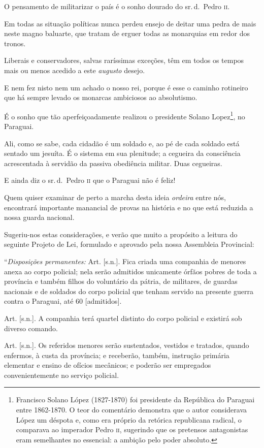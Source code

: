 O pensamento de militarizar o país é o sonho dourado do sr.\,d.~Pedro \textsc{ii}.

Em todas as situação políticas nunca perdeu ensejo de deitar uma pedra
de mais neste magno baluarte, que tratam de erguer todas as monarquias
em redor dos tronos.

Liberais e conservadores, salvas raríssimas exceções, têm em todos os
tempos mais ou menos acedido a este \emph{augusto} desejo.

E nem fez nisto nem um achado o nosso rei, porque é esse o caminho
rotineiro que há sempre levado os monarcas ambiciosos ao absolutismo.

É o sonho que tão aperfeiçoadamente realizou o presidente Solano
Lopez\footnote{Francisco Solano López (1827-1870) foi presidente da
  República do Paraguai entre 1862-1870. O teor do comentário demonstra
  que o autor considerava López um déspota e, como era próprio da
  retórica republicana radical, o comparava ao imperador Pedro \textsc{ii},
  sugerindo que os pretensos antagonistas eram semelhantes no essencial:
  a ambição pelo poder absoluto.}, no Paraguai.

Ali, como se sabe, cada cidadão é um soldado e, ao pé de cada soldado
está sentado um jesuíta. É o sistema em sua plenitude; a cegueira da
consciência acrescentada à servidão da passiva obediência militar. Duas
cegueiras.

E ainda diz o sr.\,d.~Pedro \textsc{ii} que o Paraguai não é feliz!

Quem quiser examinar de perto a marcha desta ideia \emph{ordeira} entre
nós, encontrará importante manancial de provas na história e no que está
reduzida a nossa guarda nacional.

Sugeriu-nos estas considerações, e verão que muito a propósito a leitura
do seguinte Projeto de Lei, formulado e aprovado pela nossa Assembleia
Provincial:

``\emph{Disposições permanentes:} Art. {[}s.n.{]}. Fica criada uma
companhia de menores anexa ao corpo policial; nela serão admitidos
unicamente órfãos pobres de toda a província e também filhos do
voluntário da pátria, de militares, de guardas nacionais e de soldados
do corpo policial que tenham servido na presente guerra contra o
Paraguai, até 60 {[}admitidos{]}.

Art. {[}s.n.{]}. A companhia terá quartel distinto do corpo policial e
existirá sob diverso comando.

Art. {[}s.n.{]}. Os referidos menores serão sustentados, vestidos e
tratados, quando enfermos, à custa da província; e receberão, também,
instrução primária elementar e ensino de ofícios mecânicos; e poderão
ser empregados convenientemente no serviço policial.

